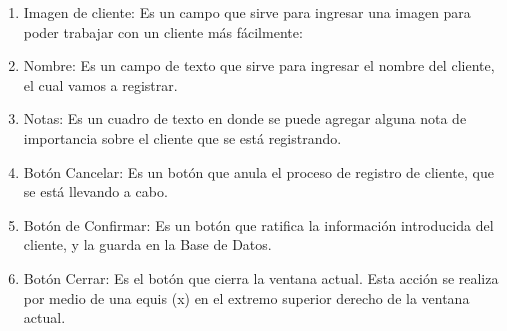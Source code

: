 \documentclass[a4paper,DIV=12]{scrreprt}
\begin{document}
\begin{enumerate}
	\item{Imagen de cliente: Es un campo que sirve para ingresar una imagen para poder trabajar con un cliente más fácilmente:\\}
	
    \item{Nombre: Es un campo de texto que sirve para ingresar el nombre del cliente, el cual vamos a registrar.\\ }
    \item{Notas: Es un cuadro de texto en donde se puede agregar alguna nota de importancia sobre el cliente que se está registrando. \\}
    \item{Botón Cancelar: Es un botón que anula el proceso de registro de cliente, que se está llevando a cabo. \\}
    \item{Botón de Confirmar: Es un botón que ratifica la información introducida del cliente, y la guarda en la Base de Datos.\\}
	\item{Botón Cerrar: Es el botón que cierra la ventana actual. Esta acción se realiza por medio de una equis (x) en el extremo superior derecho de la ventana actual. }
	
\end{enumerate}
\end{document}
